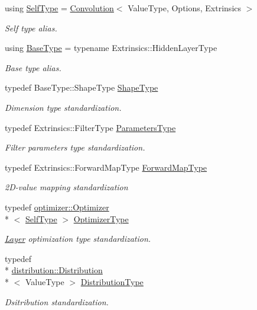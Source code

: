 \begin{DoxyCompactItemize}
\item 
using \hyperlink{classffnn_1_1layer_1_1_convolution_ac3985357df433360d75f39353faae600}{Self\-Type} = \hyperlink{classffnn_1_1layer_1_1_convolution}{Convolution}$<$ Value\-Type, Options, Extrinsics $>$
\begin{DoxyCompactList}\small\item\em Self type alias. \end{DoxyCompactList}\item 
using \hyperlink{classffnn_1_1layer_1_1_convolution_a30a3026202f29a601e539c80824fcf1f}{Base\-Type} = typename Extrinsics\-::\-Hidden\-Layer\-Type
\begin{DoxyCompactList}\small\item\em Base type alias. \end{DoxyCompactList}\item 
typedef Base\-Type\-::\-Shape\-Type \hyperlink{classffnn_1_1layer_1_1_convolution_ab76070ee3cc7b42325f46bc3bc86bf5f}{Shape\-Type}
\begin{DoxyCompactList}\small\item\em Dimension type standardization. \end{DoxyCompactList}\item 
typedef Extrinsics\-::\-Filter\-Type \hyperlink{classffnn_1_1layer_1_1_convolution_ad66f693126a5a4b3cc7398f3be7c22a7}{Parameters\-Type}
\begin{DoxyCompactList}\small\item\em Filter parameters type standardization. \end{DoxyCompactList}\item 
typedef Extrinsics\-::\-Forward\-Map\-Type \hyperlink{classffnn_1_1layer_1_1_convolution_a5042d4aa0d40a1f1b719340eb5e62edc}{Forward\-Map\-Type}
\begin{DoxyCompactList}\small\item\em 2\-D-\/value mapping standardization \end{DoxyCompactList}\item 
typedef \hyperlink{classffnn_1_1optimizer_1_1_optimizer}{optimizer\-::\-Optimizer}\\*
$<$ \hyperlink{classffnn_1_1layer_1_1_convolution_ac3985357df433360d75f39353faae600}{Self\-Type} $>$ \hyperlink{classffnn_1_1layer_1_1_convolution_a2daee819da77dc38cb3861397a02903c}{Optimizer\-Type}
\begin{DoxyCompactList}\small\item\em \hyperlink{classffnn_1_1layer_1_1_layer}{Layer} optimization type standardization. \end{DoxyCompactList}\item 
typedef \\*
\hyperlink{classffnn_1_1distribution_1_1_distribution}{distribution\-::\-Distribution}\\*
$<$ Value\-Type $>$ \hyperlink{classffnn_1_1layer_1_1_convolution_a9c7844d7a6397adba38599846f7ba75c}{Distribution\-Type}
\begin{DoxyCompactList}\small\item\em Dsitribution standardization. \end{DoxyCompactList}\end{DoxyCompactItemize}
